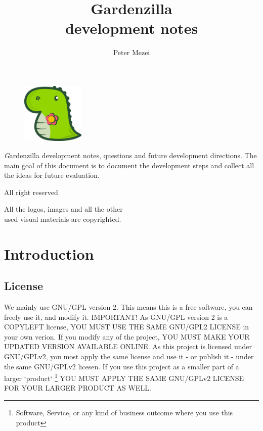 \documentclass{article}
\author{Peter Mezei}
\title{Gardenzilla \\ development notes}
\begin{document}
\maketitle
\thispagestyle{empty}
\newpage
\thispagestyle{empty}
\begin{figure}
  \centering
  \includegraphics[width=3cm]{logo.png}
\end{figure}
\begin{center}
  {\textit  Gardenzilla development notes, questions and future development directions. The main goal of this document is to document the development steps and collect all the ideas for future evaluation.

    \vspace{1cm} All right reserved \the\year{}

    All the logos, images and all the other\\ used visual materials are copyrighted.
  }
\end{center}
\newpage
\thispagestyle{empty}
\tableofcontents
\newpage
\section{Introduction}

\subsection{License}


We mainly use GNU/GPL version 2. This means this is a free software,
you can freely use it, and modify it. IMPORTANT! As GNU/GPL version 2
is a COPYLEFT license, YOU MUST USE THE SAME GNU/GPL2 LICENSE in your
own verion. If you modify any of the project, YOU MUST MAKE YOUR
UPDATED VERSION AVAILABLE ONLINE. As this project is licensed under
GNU/GPLv2, you most apply the same license and use it - or publish it
- under the same GNU/GPLv2 licesen. If you use this project as a smaller
part of a larger `product`
\footnote{Software, Service, or any kind of
  business outcome where you use this product}
YOU MUST APPLY THE SAME GNU/GPLv2 LICENSE FOR YOUR LARGER PRODUCT AS WELL.
\end{document}

